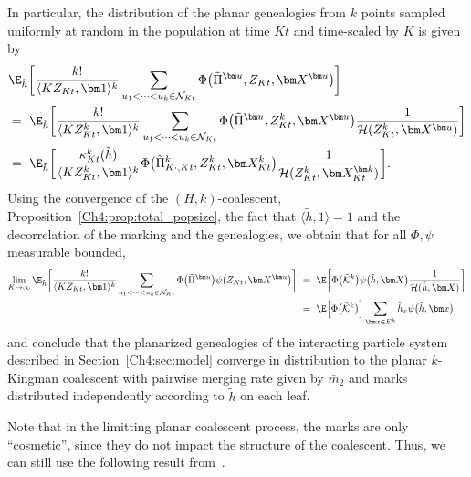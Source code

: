 \begin{refsegment}
In particular, the distribution of the planar genealogies from $k$ points sampled uniformly at random in the population at time $Kt$ and time-scaled by $K$ is given by
\begin{align*}
&\E_{\tilde h}\bigg[\frac{k!}{\langle K Z_{Kt}, \bm 1\rangle^k}\sum_{u_1 < \cdots < u_k\in\mathcal{N}_{Kt}}\Phi\big(\tilde \Pi^{\bm u},Z_{Kt}, \bm X^{\bm u}\big)\bigg]\\
 &=\ \E_{\tilde h}\bigg[\frac{k!}{\langle KZ^k_{Kt}, \bm 1\rangle^k}\sum_{u_1 < \cdots < u_k\in\mathcal{N}_{Kt}}\Phi\big(\tilde \Pi^{\bm u},Z^k_{Kt}, \bm X^{\bm u}\big)\frac{1}{\mathcal{H}(Z^k_{Kt}, \bm X^{\bm u})}\bigg]\\
&=\ \E_{\tilde h}\bigg[\frac{\kappa^k_{Kt}(\tilde h)}{\langle K Z^k_{Kt}, \bm 1\rangle^k}\Phi\big(\tilde \Pi^k_{K\cdot, Kt},Z^k_{Kt}, \bm X^k_{Kt}\big)\frac{1}{\mathcal{H}(Z^k_{Kt}, \bm X^{\bm k}_{Kt})}\bigg].
\end{align*}
Using the convergence of the $(H,k)$-coalescent, Proposition~\ref{Ch4:prop:total_popsize}, the fact that $\langle \tilde h, 1\rangle =1$ and the decorrelation of the marking and the genealogies, we obtain that for all $\Phi,\psi$ measurable bounded,
\begin{align*}
\lim_{K\to\infty }\E_{\tilde h}\bigg[\frac{k!}{\langle K Z_{Kt}, \bm 1\rangle^k}\sum_{u_1 < \cdots < u_k\in\mathcal{N}_{Kt}}\Phi\big(\tilde \Pi^{\bm u}\big)\psi\big(Z_{Kt}, \bm X^{\bm u}\big)\bigg]\ &=\ \E\bigg[\Phi\big(\tilde{\mathcal{K}}^k_{\cdot}\big)\psi\big(\tilde h , \bm X\big)\frac{1}{\mathcal{H}(\tilde h, \bm X)}\bigg]\\
&=\ \E\Big[\Phi\big(\tilde{\mathcal{K}}^k_{\cdot}\big)\Big]\sum_{\bm x\in E^k}\tilde h_x \psi\big(\tilde h , \bm x \big).
\end{align*}
and conclude that the planarized genealogies of the interacting particle system described in Section~\ref{Ch4:sec:model} converge in distribution to the planar $k$-Kingman coalescent with pairwise merging rate given by $\bar m_2$ and marks distributed independently according to $\tilde h$ on each leaf.


Note that in the limitting planar coalescent process, the marks are only ``cosmetic'', since they do not impact the structure of the coalescent. Thus, we can still use the following result from~\citet[Lemma~3.1]{Foutel-Rodier:UMS}.


\end{refsegment}
